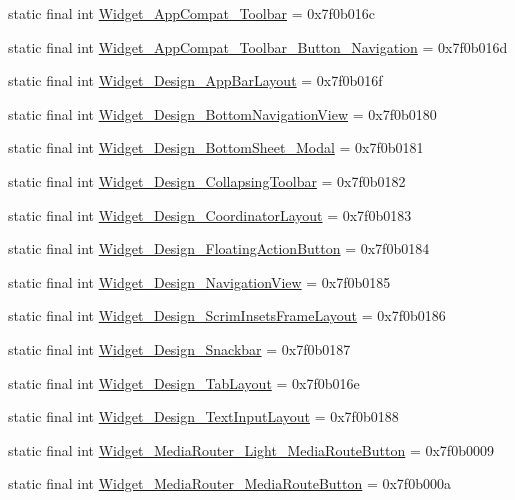 \begin{CompactItemize}
\item 
static final int \hyperlink{classandroid_1_1support_1_1v4_1_1_r_1_1style_94907a58dd8ad1139df9192c1937f554}{Widget\_\-AppCompat\_\-Toolbar} = 0x7f0b016c
\item 
static final int \hyperlink{classandroid_1_1support_1_1v4_1_1_r_1_1style_86ac548fb7702108696ae2cd241872a9}{Widget\_\-AppCompat\_\-Toolbar\_\-Button\_\-Navigation} = 0x7f0b016d
\item 
static final int \hyperlink{classandroid_1_1support_1_1v4_1_1_r_1_1style_90bf021863e48ccacaa4fb3b316ab9bc}{Widget\_\-Design\_\-AppBarLayout} = 0x7f0b016f
\item 
static final int \hyperlink{classandroid_1_1support_1_1v4_1_1_r_1_1style_7414358491dd4df47d04d5db45d2b925}{Widget\_\-Design\_\-BottomNavigationView} = 0x7f0b0180
\item 
static final int \hyperlink{classandroid_1_1support_1_1v4_1_1_r_1_1style_fec1312cb0cddcba425ba3c6b0aed15a}{Widget\_\-Design\_\-BottomSheet\_\-Modal} = 0x7f0b0181
\item 
static final int \hyperlink{classandroid_1_1support_1_1v4_1_1_r_1_1style_8e8730ef25713d76abe8583f79acc870}{Widget\_\-Design\_\-CollapsingToolbar} = 0x7f0b0182
\item 
static final int \hyperlink{classandroid_1_1support_1_1v4_1_1_r_1_1style_140474dd22eb20cc38ef35dde03fd41d}{Widget\_\-Design\_\-CoordinatorLayout} = 0x7f0b0183
\item 
static final int \hyperlink{classandroid_1_1support_1_1v4_1_1_r_1_1style_8dbd3c7c2c5facf658aa6acfc9cc27da}{Widget\_\-Design\_\-FloatingActionButton} = 0x7f0b0184
\item 
static final int \hyperlink{classandroid_1_1support_1_1v4_1_1_r_1_1style_9859b31b4cdb8db307286af1069370c8}{Widget\_\-Design\_\-NavigationView} = 0x7f0b0185
\item 
static final int \hyperlink{classandroid_1_1support_1_1v4_1_1_r_1_1style_1579f571096b06e9ca37c808573896f3}{Widget\_\-Design\_\-ScrimInsetsFrameLayout} = 0x7f0b0186
\item 
static final int \hyperlink{classandroid_1_1support_1_1v4_1_1_r_1_1style_41c1e5155e24637f6f6fff2b61cd3959}{Widget\_\-Design\_\-Snackbar} = 0x7f0b0187
\item 
static final int \hyperlink{classandroid_1_1support_1_1v4_1_1_r_1_1style_390b0ced9d7b4101d34048f84d00e117}{Widget\_\-Design\_\-TabLayout} = 0x7f0b016e
\item 
static final int \hyperlink{classandroid_1_1support_1_1v4_1_1_r_1_1style_4a838f64fc1cb07317df56fc08286449}{Widget\_\-Design\_\-TextInputLayout} = 0x7f0b0188
\item 
static final int \hyperlink{classandroid_1_1support_1_1v4_1_1_r_1_1style_9bfdbb86499fd8304c6e29be144014d7}{Widget\_\-MediaRouter\_\-Light\_\-MediaRouteButton} = 0x7f0b0009
\item 
static final int \hyperlink{classandroid_1_1support_1_1v4_1_1_r_1_1style_9e6d59254979dede607a473e02c37f4c}{Widget\_\-MediaRouter\_\-MediaRouteButton} = 0x7f0b000a
\end{CompactItemize}


